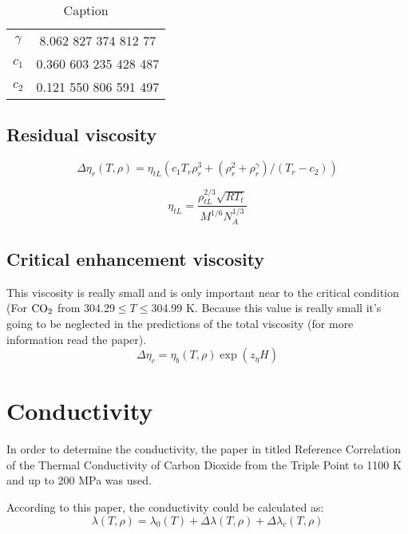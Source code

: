 \begin{table}[ht]
    \centering
    \begin{tabular}{c c}
    \hline
    \hline
    $\gamma$   & 8.062 827 374 812 77    \\  
    $c_1$ & 0.360 603 235 428 487    \\       
    $c_2$   & 0.121 550 806 591 497   \\
    \hline
    \end{tabular}
    \caption{Caption}
    \label{tab:my_label3}
\end{table}


\subsection{Residual viscosity}

\begin{equation}
    \Delta\eta_r(T,\rho) = \eta_{tL}(c_1T_r\rho_r^3 + (\rho_r^2 + \rho_r^\gamma)/(T_r -c_2))
\end{equation}

\begin{equation}
    \eta_{tL} = \frac{\rho_{tL}^{2/3} \sqrt{RT_t}}{M^{1/6}N_A^{1/3}}
\end{equation}

\subsection{Critical enhancement viscosity}
This viscosity is really small and is only important near to the critical condition (For $\ce{CO2}$ from 304.29$\leq T\leq$304.99 K. Because this value is really small it's going to be neglected in the predictions of the total viscosity (for more information read the paper). 
\begin{equation}
    \Delta\eta_c = \eta_b(T,\rho)\exp{\left(z_\eta H\right)}
\end{equation}

\section{Conductivity}
In order to determine the conductivity, the paper in titled Reference Correlation of the Thermal Conductivity of Carbon Dioxide from the Triple Point to 1100 K and up to 200 MPa was used.

According to this paper, the conductivity could be calculated as:
\begin{equation}
    \lambda(T,\rho) = \lambda_0(T) + \Delta\lambda(T,\rho) + \Delta\lambda_c(T,\rho)    
\end{equation}

